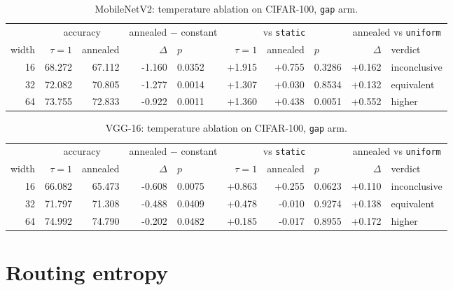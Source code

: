 \documentclass[10pt,a4paper]{article}
\begin{document}
\begin{table}[!htbp]\centering\small
\caption{MobileNetV2: temperature ablation on CIFAR-100, \texttt{gap} arm.}
\label{tab:mbtemp}
\begin{tabular}{r rr rl r rl rl}
\toprule
& \multicolumn{2}{c}{accuracy} & \multicolumn{2}{c}{annealed $-$ constant}
& \multicolumn{3}{c}{vs \texttt{static}} & \multicolumn{2}{c}{annealed vs \texttt{uniform}} \\
\cmidrule(lr){2-3}\cmidrule(lr){4-5}\cmidrule(lr){6-8}\cmidrule(lr){9-10}
width & $\tau=1$ & annealed & $\Delta$ & $p$ & $\tau=1$ & annealed & $p$ & $\Delta$ & verdict \\
\midrule
16 & 68.272 & 67.112 & -1.160 & 0.0352 & +1.915 & +0.755 & 0.3286 & +0.162 & inconclusive \\
32 & 72.082 & 70.805 & -1.277 & 0.0014 & +1.307 & +0.030 & 0.8534 & +0.132 & equivalent \\
64 & 73.755 & 72.833 & -0.922 & 0.0011 & +1.360 & +0.438 & 0.0051 & +0.552 & higher \\
\bottomrule
\end{tabular}
\end{table}

\begin{table}[!htbp]\centering\small
\caption{VGG-16: temperature ablation on CIFAR-100, \texttt{gap} arm.}
\label{tab:vgtemp}
\begin{tabular}{r rr rl r rl rl}
\toprule
& \multicolumn{2}{c}{accuracy} & \multicolumn{2}{c}{annealed $-$ constant}
& \multicolumn{3}{c}{vs \texttt{static}} & \multicolumn{2}{c}{annealed vs \texttt{uniform}} \\
\cmidrule(lr){2-3}\cmidrule(lr){4-5}\cmidrule(lr){6-8}\cmidrule(lr){9-10}
width & $\tau=1$ & annealed & $\Delta$ & $p$ & $\tau=1$ & annealed & $p$ & $\Delta$ & verdict \\
\midrule
16 & 66.082 & 65.473 & -0.608 & 0.0075 & +0.863 & +0.255 & 0.0623 & +0.110 & inconclusive \\
32 & 71.797 & 71.308 & -0.488 & 0.0409 & +0.478 & -0.010 & 0.9274 & +0.138 & equivalent \\
64 & 74.992 & 74.790 & -0.202 & 0.0482 & +0.185 & -0.017 & 0.8955 & +0.172 & higher \\
\bottomrule
\end{tabular}
\end{table}

\section{Routing entropy}\label{sec:entropy}
\end{document}
